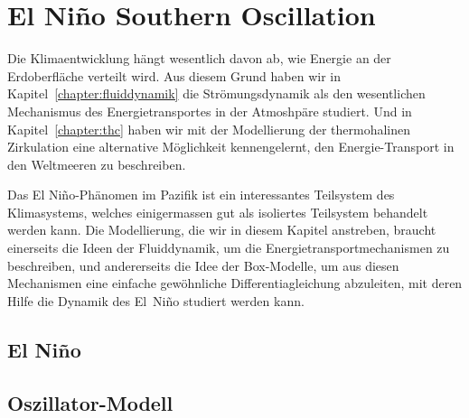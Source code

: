 %
%
%
\chapter{El Niño Southern Oscillation}
Die Klimaentwicklung hängt wesentlich davon ab, wie Energie an der
Erdoberfläche verteilt wird.
Aus diesem Grund haben wir in Kapitel~\ref{chapter:fluiddynamik}
die Strömungsdynamik als den wesentlichen Mechanismus des 
Energietransportes in der Atmoshpäre studiert.
Und in Kapitel~\ref{chapter:thc} haben wir mit der Modellierung der
thermohalinen Zirkulation eine alternative Möglichkeit kennengelernt,
den Energie-Transport in den Weltmeeren zu beschreiben.

Das El Niño-Phänomen im Pazifik ist ein interessantes Teilsystem des
Klimasystems, welches einigermassen gut als isoliertes Teilsystem 
behandelt werden kann.
Die Modellierung, die wir in diesem Kapitel anstreben, braucht
einerseits die Ideen der Fluiddynamik, um die Energietransportmechanismen
zu beschreiben, und andererseits die Idee der Box-Modelle, um aus diesen
Mechanismen eine einfache gewöhnliche Differentiagleichung abzuleiten,
mit deren Hilfe die Dynamik des El~Niño studiert werden kann.



\section{El Niño}

\section{Oszillator-Modell}

